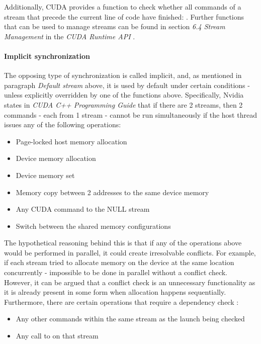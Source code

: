 Additionally, CUDA provides a function to check whether all commands of a stream that precede the current line of code have finished: . Further functions that can be used to manage streams can be found in section \emph{6.4 Stream Management} in the \emph{CUDA Runtime API} \cite{NvidiaJanuary2022}.

\paragraph{Implicit synchronization}\label{Paragraph:CUDA-asynchronous-concurrent-execution-streams-implicit-synchronization}
The opposing type of synchronization is called implicit, and, as mentioned in paragraph \textit{Default stream} above, it is used by default under certain conditions - unless explicitly overridden by one of the functions above. Specifically, Nvidia states in \emph{CUDA C++ Programming Guide} \cite{NVIDIAMay2022} that if there are 2 streams, then 2 commands - each from 1 stream - cannot be run simultaneously if the host thread issues any of the following operations:

\begin{itemize}
	\item Page-locked host memory allocation
	\item Device memory allocation
	\item Device memory set
	\item Memory copy between 2 addresses to the same device memory
	\item Any CUDA command to the NULL stream
	\item Switch between the shared memory configurations
\end{itemize}

The hypothetical reasoning behind this is that if any of the operations above would be performed in parallel, it could create irresolvable conflicts. For example, if each stream tried to allocate memory on the device at the same location concurrently - impossible to be done in parallel without a conflict check. However, it can be argued that a conflict check is an unnecessary functionality as it is already present in some form when allocation happens sequentially. \\
Furthermore, there are certain operations that require a dependency check \cite{NVIDIAMay2022}:

\begin{itemize}
	\item Any other commands within the same stream as the launch being checked
	\item Any call to  on that stream
\end{itemize}

